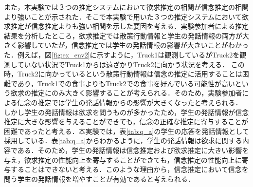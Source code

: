 \par
また，本実験では３つの推定システムにおいて欲求推定の相関が信念推定の相関より強いことが示された．そこで本実験で用いた３つの推定システムにおいて欲求推定が信念推定よりも強い相関を示した要因を考える．実験参加者による推定結果を分析したところ，欲求推定では散策行動情報と学生の発話情報の両方が大きく影響していたが，信念推定では学生の発話情報の影響が大きいことがわかった．例えば，図\ref{fig:ex_env2}に示すように，Truck1は観測しているがTruck2を観測していない状況でTruck1からは遠ざかりTruck2に向かう状況を考える．
この時，Truck2に向かっているという散策行動情報は信念の推定に活用することは困難であり，Truck1での食事よりもTruck2での食事を好んでいる可能性が高いという欲求の推定にのみ大きく影響することが考えられる．そのため，実験参加者による信念の推定では学生の発話情報からの影響が大きくなったと考えられる．
しかし学生の発話情報は欲求を問うものが多かったため，学生の発話情報が信念推定に大きな影響を与えることができても，信念の正確な推定に寄与することが困難であったと考える．本実験では，表\ref{tab:q_a}の学生の応答を発話情報として採用している．表\ref{tab:q_a}からわかるように，学生の発話情報は欲求に関する内容である．そのため，学生の発話情報は信念推定および欲求推定に大きい影響を与え，欲求推定の性能向上を寄与することができても，信念推定の性能向上に寄与することはできないと考える．このような理由から，信念推定において信念を問う学生の発話情報を増やすことが有効であると考えられる．
